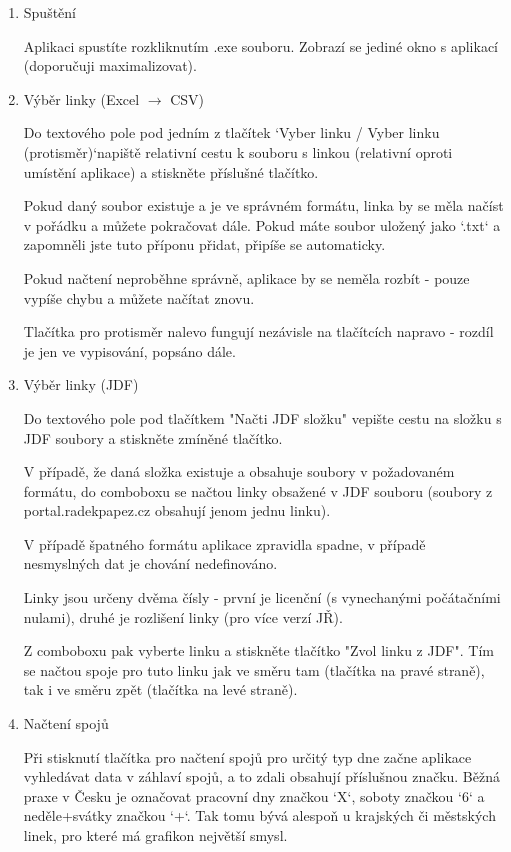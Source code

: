 \documentclass[14pt]{article}
\begin{document}
\begin{enumerate}
\item Spuštění 

Aplikaci spustíte rozkliknutím .exe souboru. Zobrazí se jediné okno s aplikací (doporučuji maximalizovat).

\item Výběr linky (Excel $\rightarrow$ CSV)

Do textového pole pod jedním z tlačítek `Vyber linku / Vyber linku (protisměr)`napiště relativní cestu k souboru s linkou (relativní oproti umístění aplikace) a stiskněte příslušné tlačítko.
 
Pokud daný soubor existuje a je ve správném formátu, linka by se měla načíst v pořádku a můžete pokračovat dále. Pokud máte soubor uložený jako `.txt` a zapomněli jste tuto příponu přidat, připíše se automaticky.

Pokud načtení neproběhne správně, aplikace by se neměla rozbít - pouze vypíše chybu a můžete načítat znovu.

Tlačítka pro protisměr nalevo fungují nezávisle na tlačítcích napravo - rozdíl je jen ve vypisování, popsáno dále.

\item Výběr linky (JDF)

Do textového pole pod tlačítkem "Načti JDF složku" vepište cestu na složku s JDF soubory a stiskněte zmíněné tlačítko.

V případě, že daná složka existuje a obsahuje soubory v požadovaném formátu, do comboboxu se načtou linky obsažené v JDF souboru (soubory z portal.radekpapez.cz obsahují jenom jednu linku). 

V případě špatného formátu aplikace zpravidla spadne, v případě nesmyslných dat je chování nedefinováno. 

Linky jsou určeny dvěma čísly - první je licenční (s vynechanými počátačními nulami), druhé je rozlišení linky (pro více verzí JŘ).

Z comboboxu pak vyberte linku a stiskněte tlačítko "Zvol linku z JDF". Tím se načtou spoje pro tuto linku jak ve směru tam (tlačítka na pravé straně), tak i ve směru zpět (tlačítka na levé straně).


\item Načtení spojů

Při stisknutí tlačítka pro načtení spojů pro určitý typ dne začne aplikace vyhledávat data v záhlaví spojů, a to zdali obsahují příslušnou značku. 
Běžná praxe v Česku je označovat pracovní dny značkou `X`, soboty značkou `6` a neděle+svátky značkou `+`. 
Tak tomu bývá alespoň u krajských či městských linek, pro které má grafikon největší smysl.


\end{enumerate}
\end{document}

